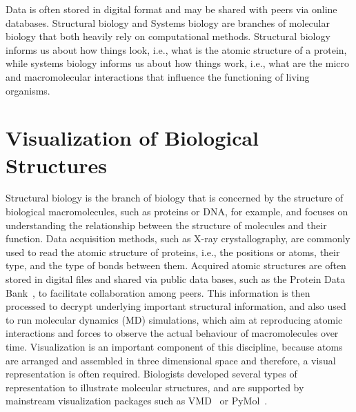 Data is often stored in digital format and may be shared with peers via online databases.
Structural biology and Systems biology are branches of molecular biology that both heavily rely on computational methods.
Structural biology informs us about how things look, i.e., what is the atomic structure of a protein, while systems biology informs us about how things work, i.e., what are the micro and macromolecular interactions that influence the functioning of living organisms.

\section{Visualization of Biological Structures}

Structural biology is the branch of biology that is concerned by the structure of biological macromolecules, such as proteins or DNA, for example, and focuses on understanding the relationship between the structure of molecules and their function.
Data acquisition methods, such as X-ray crystallography, are commonly used to read the atomic structure of proteins, i.e., the positions or atoms, their type, and the type of bonds between them.
Acquired atomic structures are often stored in digital files and shared via public data bases, such as the Protein Data Bank~\cite{bernstein1977protein}, to facilitate collaboration among peers.
This information is then processed to decrypt underlying important structural information, and also used to run molecular dynamics (MD) simulations, which aim at reproducing atomic interactions and forces to observe the actual behaviour of macromolecules over time.
Visualization is an important component of this discipline, because atoms are arranged and assembled in three dimensional space and therefore, a visual representation is often required.
Biologists developed several types of representation to illustrate molecular structures, and are supported by mainstream visualization packages such as VMD~\cite{humphrey1996vmd} or PyMol~\cite{PyMOL}.

